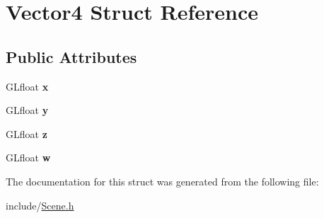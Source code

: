 \hypertarget{structVector4}{\section{Vector4 Struct Reference}
\label{structVector4}
}
\subsection*{Public Attributes}
\begin{DoxyCompactItemize}
\item 
\hypertarget{structVector4_a217098b33e968a26b5e6ff481ee04cf7}{G\-Lfloat {\bfseries x}}\label{structVector4_a217098b33e968a26b5e6ff481ee04cf7}

\item 
\hypertarget{structVector4_a91f362cb35f1d3f37b29967450f45cd5}{G\-Lfloat {\bfseries y}}\label{structVector4_a91f362cb35f1d3f37b29967450f45cd5}

\item 
\hypertarget{structVector4_afb1e3f931f0e733c93f867d3f16cce75}{G\-Lfloat {\bfseries z}}\label{structVector4_afb1e3f931f0e733c93f867d3f16cce75}

\item 
\hypertarget{structVector4_afa300dc6085acd21cc95b44118ef42af}{G\-Lfloat {\bfseries w}}\label{structVector4_afa300dc6085acd21cc95b44118ef42af}

\end{DoxyCompactItemize}


The documentation for this struct was generated from the following file\-:\begin{DoxyCompactItemize}
\item 
include/\hyperlink{Scene_8h}{Scene.\-h}\end{DoxyCompactItemize}
